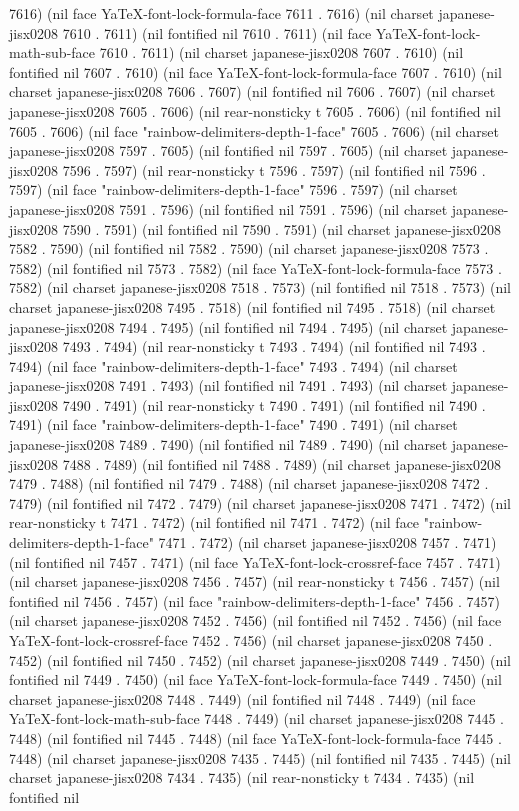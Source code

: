 7616) (nil face YaTeX-font-lock-formula-face 7611 . 7616) (nil charset japanese-jisx0208 7610 . 7611) (nil fontified nil 7610 . 7611) (nil face YaTeX-font-lock-math-sub-face 7610 . 7611) (nil charset japanese-jisx0208 7607 . 7610) (nil fontified nil 7607 . 7610) (nil face YaTeX-font-lock-formula-face 7607 . 7610) (nil charset japanese-jisx0208 7606 . 7607) (nil fontified nil 7606 . 7607) (nil charset japanese-jisx0208 7605 . 7606) (nil rear-nonsticky t 7605 . 7606) (nil fontified nil 7605 . 7606) (nil face "rainbow-delimiters-depth-1-face" 7605 . 7606) (nil charset japanese-jisx0208 7597 . 7605) (nil fontified nil 7597 . 7605) (nil charset japanese-jisx0208 7596 . 7597) (nil rear-nonsticky t 7596 . 7597) (nil fontified nil 7596 . 7597) (nil face "rainbow-delimiters-depth-1-face" 7596 . 7597) (nil charset japanese-jisx0208 7591 . 7596) (nil fontified nil 7591 . 7596) (nil charset japanese-jisx0208 7590 . 7591) (nil fontified nil 7590 . 7591) (nil charset japanese-jisx0208 7582 . 7590) (nil fontified nil 7582 . 7590) (nil charset japanese-jisx0208 7573 . 7582) (nil fontified nil 7573 . 7582) (nil face YaTeX-font-lock-formula-face 7573 . 7582) (nil charset japanese-jisx0208 7518 . 7573) (nil fontified nil 7518 . 7573) (nil charset japanese-jisx0208 7495 . 7518) (nil fontified nil 7495 . 7518) (nil charset japanese-jisx0208 7494 . 7495) (nil fontified nil 7494 . 7495) (nil charset japanese-jisx0208 7493 . 7494) (nil rear-nonsticky t 7493 . 7494) (nil fontified nil 7493 . 7494) (nil face "rainbow-delimiters-depth-1-face" 7493 . 7494) (nil charset japanese-jisx0208 7491 . 7493) (nil fontified nil 7491 . 7493) (nil charset japanese-jisx0208 7490 . 7491) (nil rear-nonsticky t 7490 . 7491) (nil fontified nil 7490 . 7491) (nil face "rainbow-delimiters-depth-1-face" 7490 . 7491) (nil charset japanese-jisx0208 7489 . 7490) (nil fontified nil 7489 . 7490) (nil charset japanese-jisx0208 7488 . 7489) (nil fontified nil 7488 . 7489) (nil charset japanese-jisx0208 7479 . 7488) (nil fontified nil 7479 . 7488) (nil charset japanese-jisx0208 7472 . 7479) (nil fontified nil 7472 . 7479) (nil charset japanese-jisx0208 7471 . 7472) (nil rear-nonsticky t 7471 . 7472) (nil fontified nil 7471 . 7472) (nil face "rainbow-delimiters-depth-1-face" 7471 . 7472) (nil charset japanese-jisx0208 7457 . 7471) (nil fontified nil 7457 . 7471) (nil face YaTeX-font-lock-crossref-face 7457 . 7471) (nil charset japanese-jisx0208 7456 . 7457) (nil rear-nonsticky t 7456 . 7457) (nil fontified nil 7456 . 7457) (nil face "rainbow-delimiters-depth-1-face" 7456 . 7457) (nil charset japanese-jisx0208 7452 . 7456) (nil fontified nil 7452 . 7456) (nil face YaTeX-font-lock-crossref-face 7452 . 7456) (nil charset japanese-jisx0208 7450 . 7452) (nil fontified nil 7450 . 7452) (nil charset japanese-jisx0208 7449 . 7450) (nil fontified nil 7449 . 7450) (nil face YaTeX-font-lock-formula-face 7449 . 7450) (nil charset japanese-jisx0208 7448 . 7449) (nil fontified nil 7448 . 7449) (nil face YaTeX-font-lock-math-sub-face 7448 . 7449) (nil charset japanese-jisx0208 7445 . 7448) (nil fontified nil 7445 . 7448) (nil face YaTeX-font-lock-formula-face 7445 . 7448) (nil charset japanese-jisx0208 7435 . 7445) (nil fontified nil 7435 . 7445) (nil charset japanese-jisx0208 7434 . 7435) (nil rear-nonsticky t 7434 . 7435) (nil fontified nil 
